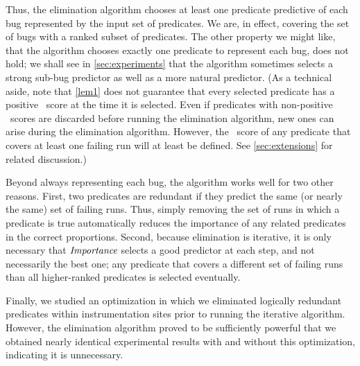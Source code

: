 Thus, the elimination algorithm chooses at least one predicate
predictive of each bug represented by the input set of predicates.
We are, in effect, covering the set of bugs with a ranked subset of predicates.
The other property we might like, that the algorithm chooses exactly
one predicate to represent each bug, does not hold; we shall see in
\autoref{sec:experiments} that the algorithm sometimes selects a
strong sub-bug predictor as well as a more natural predictor.  (As a
technical aside, note that \autoref{lem1} does not guarantee that every
selected predicate has a positive \increase\ score at the time it is
selected.  Even if predicates with non-positive \increase\ scores are
discarded before running the elimination algorithm, new ones can arise
during the elimination algorithm.  However, the
\increase\ score of any predicate that covers at least one failing run will
at least be defined.  See \autoref{sec:extensions} for related discussion.)

Beyond always representing each bug, the algorithm works well for two
other reasons.  First, two predicates are redundant if they predict
the same (or nearly the same) set of failing runs.  Thus, simply
removing the set of runs in which a predicate is true automatically
reduces the importance of any related predicates in the
correct proportions. Second, because elimination is iterative, it is
only necessary that $\textit{Importance}$ selects a good predictor at each
step, and not necessarily the best one; any predicate that covers a
different set of failing runs than all higher-ranked predicates is
selected eventually.

Finally, we studied an optimization in which we eliminated logically redundant
predicates within instrumentation sites prior to running the iterative algorithm.
However, the elimination algorithm proved to be sufficiently powerful that
we obtained nearly identical experimental results with and without 
this optimization, indicating it is unnecessary. 


